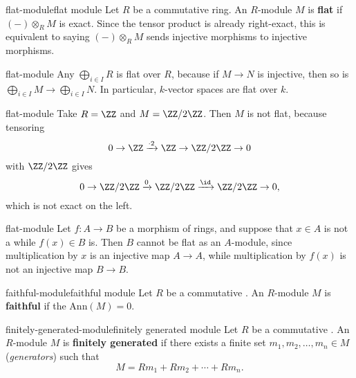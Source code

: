 \begin{topic}{flat-module}{flat module}
    Let $R$ be a commutative ring. An $R$-module $M$ is \textbf{flat} if $(-) \otimes_R M$ is exact. Since the tensor product is already right-exact, this is equivalent to saying $(-) \otimes_R M$ sends injective morphisms to injective morphisms.
\end{topic}

\begin{example}{flat-module}
    Any  $\bigoplus_{i \in I} R$ is flat over $R$, because if $M \to N$ is injective, then so is $\bigoplus_{i \in I} M \to \bigoplus_{i \in I} N$.
    In particular, $k$-vector spaces are flat over $k$.
\end{example}

\begin{example}{flat-module}
    Take $R = \ZZ$ and $M = \ZZ/2\ZZ$. Then $M$ is not flat, because tensoring
    \[ 0 \rightarrow \ZZ \xrightarrow{\cdot 2} \ZZ \rightarrow \ZZ/2\ZZ \to 0 \]
    with $\ZZ/2\ZZ$ gives
    \[ 0 \rightarrow \ZZ/2\ZZ \xrightarrow{0} \ZZ/2\ZZ \xrightarrow{\id} \ZZ/2\ZZ \to 0 , \]
    which is not exact on the left.
\end{example}

\begin{example}{flat-module}
    Let $f : A \to B$ be a morphism of rings, and suppose that $x \in A$ is not a  while $f(x) \in B$ is. Then $B$ cannot be flat as an $A$-module, since multiplication by $x$ is an injective map $A \to A$, while multiplication by $f(x)$ is not an injective map $B \to B$.
\end{example}

\begin{topic}{faithful-module}{faithful module}
     Let $R$ be a commutative . An $R$-module $M$ is \textbf{faithful} if the  $\text{Ann}(M) = 0$.
\end{topic}

\begin{topic}{finitely-generated-module}{finitely generated module}
    Let $R$ be a commutative . An $R$-module $M$ is \textbf{finitely generated} if there exists a finite set $m_1, m_2, \ldots, m_n \in M$ (\textit{generators}) such that
    \[ M = R m_1 + R m_2 + \cdots + R m_n . \]
\end{topic}

